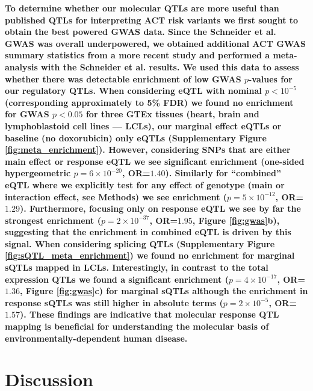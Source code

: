 \documentclass{article}
\newcommand{\tempbold}[1]{\textbf{#1}}
\begin{document}
\tempbold{To determine whether our molecular QTLs are more useful than published QTLs for interpreting ACT risk variants we first sought to obtain the best powered GWAS data. Since the Schneider et al. GWAS was overall underpowered, we obtained additional ACT GWAS summary statistics from a more recent study\cite{Serie2017} and performed a meta-analysis with the Schneider et al. results. We used this data to assess whether there was detectable enrichment of low GWAS $p$-values for our regulatory QTLs. When considering eQTL with nominal $p < 10^{-5}$ (corresponding approximately to 5\% FDR) we found no enrichment for GWAS $p<0.05$ for three GTEx tissues (heart, brain and lymphoblastoid cell lines --- LCLs), our marginal effect eQTLs or baseline (no doxorubicin) only eQTLs (Supplementary Figure \ref{fig:meta_enrichment}). However, considering SNPs that are either main effect or response eQTL we see significant enrichment (one-sided hypergeometric $p=6 \times 10^{-20}$, OR=$1.40$). Similarly for ``combined'' eQTL where we explicitly test for any effect of genotype  (main or interaction effect, see Methods) we see enrichment ($p=5 \times 10^{-12}$, OR=$1.29$). Furthermore, focusing only on response eQTL we see by far the strongest enrichment ($p=2 \times 10^{-37}$, OR=$1.95$, Figure \ref{fig:gwas}b), suggesting that the enrichment in combined eQTL is driven by this signal. When considering splicing QTLs (Supplementary Figure \ref{fig:sQTL_meta_enrichment}) we found no enrichment for marginal sQTLs mapped in LCLs\cite{li2016rna}. Interestingly, in contrast to the total expression QTLs we found a significant enrichment ($p=4 \times 10^{-17}$, OR=$1.36$, Figure \ref{fig:gwas}c) for marginal sQTLs although the enrichment in response sQTLs was still higher in absolute terms ($p=2 \times 10^{-5}$, OR=$1.57$). These findings are indicative that molecular response QTL mapping is beneficial for understanding the molecular basis of environmentally-dependent human disease.} 

\section*{Discussion}
\end{document}
